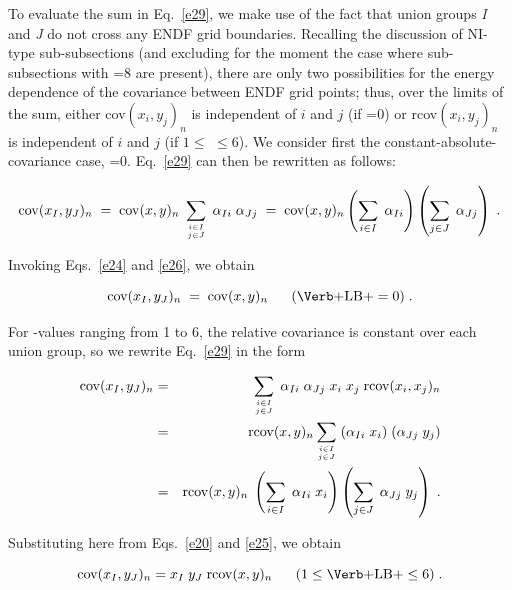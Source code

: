 To evaluate the sum in Eq.~\ref{e29}, we make use of the fact that union
groups {\it I} and {\it J} do not cross any ENDF grid boundaries.
Recalling the discussion of NI-type sub-subsections (and
excluding for the moment the case where sub-subsections with
=8 are present), there are only two possibilities for the
energy dependence of the covariance between ENDF grid points; thus,
over the limits of the sum, either cov$(x_i,y_j)_n$ is independent of
$i$ and $j$ (if =0) or rcov$(x_i,y_j)_n$ is independent of
$i$ and $j$ (if $1\leq$  $\leq 6$).  We consider first the
constant-absolute-covariance case, =0.  Eq.~\ref{e29} can then be
rewritten as follows:

\begin{equation} {\rm {\rm cov}} (x_I,y_J)_n\; = \; {\rm {\rm cov}} (x,y)_n
\; \sum_{i\in I\atop{j\in J}} \; \alpha_{Ii} \; \alpha_{Jj} \; = \;
  {\rm {\rm cov}} (x,y)_n
\left(\sum_{i\in I} \; \alpha_{Ii} \right) \left(\sum_{j\in J} \;
  \alpha_{Jj}\right) \; .
\end{equation}

\noindent
Invoking Eqs.~\ref{e24} and \ref{e26}, we obtain

\begin{equation}
{\rm cov}(x_I , y_J)_n \;=\; {\rm cov}(x,y)_n \; \;\;\;\;\;
  (\hbox{\cword{LB}} = 0) \;.
\label{e31}
\end{equation}

\noindent
For -values ranging from 1 to 6, the relative covariance is
constant over each union group, so we rewrite Eq.~\ref{e29} in the form

\begin{eqnarray}
{\rm {\rm cov}} (x_I,y_J)_n & = & \sum_{i\in I\atop{j\in J}}\; \alpha_{Ii}\;
  \alpha_{Jj} \; x_i \; x_j \;
{\rm r{\rm cov}} (x_i , x_j)_n \nonumber \\
  & = &{\rm r{\rm cov}} (x,y)_n \sum_{i\in I\atop{j\in J}}\;
 (\alpha_{Ii}\; x_i ) \; (\alpha_{Jj} \; y_j) \nonumber \\
  & = & {\rm rcov} (x,y)_n \; \left(\sum_{i\in I} \; \alpha_{Ii} \;
  x_i \right) \left(\sum_{j\in J}\; \alpha_{Jj} \; y_j \right) \; .
\label{e32}
\end{eqnarray}

\noindent
Substituting here from Eqs.~\ref{e20} and \ref{e25}, we obtain

\begin{equation}
{\rm {\rm cov}} (x_I , y_J)_n = x_I\; y_J \; {\rm r{\rm cov}} (x,y)_n
  \;\;\;\;\;\; (1
\leq\hbox{\cword{LB}}\leq 6)\; .
\label{e33}
\end{equation}

